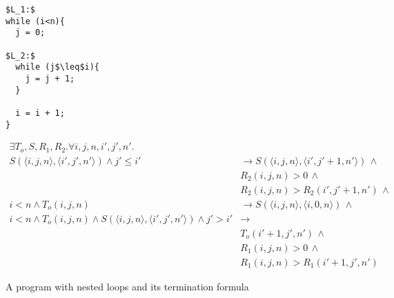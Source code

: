 \documentclass[preprint]{sigplanconf}
\theoremstyle{definition}
\begin{document}
\begin{figure*}
\begin{framed}
\begin{minipage}{0.17\textwidth}
\begin{lstlisting}[mathescape=true]
$L_1:$
while (i<n){
  j = 0;

$L_2:$
  while (j$\leq$i){
    j = j + 1;
  }

  i = i + 1;
}
\end{lstlisting}
\end{minipage}
\vline
\begin{minipage}{0.82\textwidth}
\begin{align*}
 \exists T_o, S, R_1, R_2 . \forall i, j, n, i', j', n' . \\
   S(\langle i, j, n \rangle, \langle i', j', n' \rangle) \wedge j' \leq i' & \rightarrow S(\langle i, j, n \rangle, \langle i', j'+1, n' \rangle) \, \wedge \\
   & R_2(i,j,n) > 0 \, \wedge \\
   & R_2(i,j,n) > R_2(i',j'+1,n') \, \wedge\\
   i < n \wedge T_o(i, j, n) & \rightarrow S(\langle i, j, n \rangle, \langle i, 0, n \rangle) \, \wedge \\
   i < n \wedge T_o(i, j, n) \wedge S(\langle i, j, n \rangle, \langle i', j', n' \rangle) \wedge j' > i' & \rightarrow \\
   & T_o(i'+1, j', n') \, \wedge \\
   & R_1(i, j, n) > 0 \, \wedge \\
   & R_1(i, j, n) > R_1(i'+1, j', n')
\end{align*}
\end{minipage}
\end{framed}
\caption{A program with nested loops and its termination formula\label{fig:environment-model}}
\end{figure*}



\end{document}
